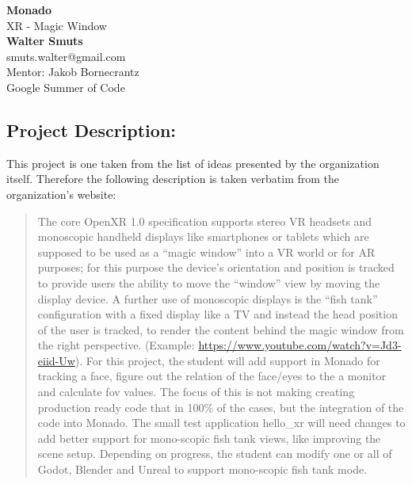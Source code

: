 \documentclass{article}
\begin{document}
\begin{center}

\LARGE{\textbf{Monado}} \\
\vspace{1em}
\Large{XR - Magic Window} \\
\vspace{1em}
\normalsize\textbf{Walter Smuts} \\
\normalsize{smuts.walter@gmail.com} \\
\vspace{1em}
\normalsize{Mentor: Jakob Bornecrantz} \\
\vspace{1em}
\normalsize{Google Summer of Code} \\

\end{center}
\begin{normalsize}

\section{Project Description:}

This project is one taken from the list of ideas presented by the organization
itself. Therefore the following description is taken verbatim from the
organization's website:

\begin{quote}

The core OpenXR 1.0 specification supports stereo VR headsets and monoscopic
handheld displays like smartphones or tablets which are supposed to be used as a
“magic window” into a VR world or for AR purposes; for this purpose the device’s
orientation and position is tracked to provide users the ability to move the
“window” view by moving the display device. A further use of monoscopic displays
is the “fish tank” configuration with a fixed display like a TV and instead the
head position of the user is tracked, to render the content behind the magic
window from the right perspective. (Example:
\url{https://www.youtube.com/watch?v=Jd3-eiid-Uw}). For this project, the student
will add support in Monado for tracking a face, figure out the relation of the
face/eyes to the a monitor and calculate fov values. The focus of this is not
making creating production ready code that in 100\% of the cases, but the
integration of the code into Monado. The small test application hello\_xr will
need changes to add better support for mono-scopic fish tank views, like improving
the scene setup. Depending on progress, the student can modify one or all of
Godot, Blender and Unreal to support mono-scopic fish tank mode.


\end{quote}
\end{normalsize}
\end{document}
